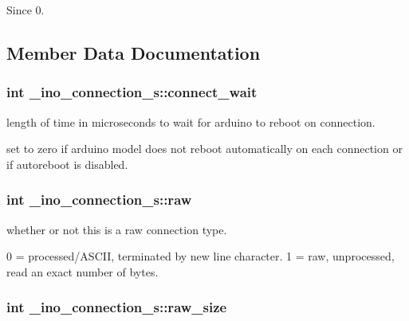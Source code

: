\begin{DoxySince}{\-Since}
0. 
\end{DoxySince}


\subsection{\-Member \-Data \-Documentation}
\hypertarget{struct__ino__connection__s_a8735c98900da1fb30ff57141d3271743}{
\subsubsection[{connect\-\_\-wait}]{\setlength{\rightskip}{0pt plus 5cm}int {\bf \-\_\-ino\-\_\-connection\-\_\-s\-::connect\-\_\-wait}}}\label{struct__ino__connection__s_a8735c98900da1fb30ff57141d3271743}


length of time in microseconds to wait for arduino to reboot on connection. 

set to zero if arduino model does not reboot automatically on each connection or if autoreboot is disabled. \hypertarget{struct__ino__connection__s_afab28b7b3db3a562789bde9c3028bb1f}{
\subsubsection[{raw}]{\setlength{\rightskip}{0pt plus 5cm}int {\bf \-\_\-ino\-\_\-connection\-\_\-s\-::raw}}}\label{struct__ino__connection__s_afab28b7b3db3a562789bde9c3028bb1f}


whether or not this is a raw connection type. 

0 = processed/\-A\-S\-C\-I\-I, terminated by new line character. 1 = raw, unprocessed, read an exact number of bytes. \hypertarget{struct__ino__connection__s_ab8b6a056a21ce7ad93f913b90db50810}{
\subsubsection[{raw\-\_\-size}]{\setlength{\rightskip}{0pt plus 5cm}int {\bf \-\_\-ino\-\_\-connection\-\_\-s\-::raw\-\_\-size}}}\label{struct__ino__connection__s_ab8b6a056a21ce7ad93f913b90db50810}


